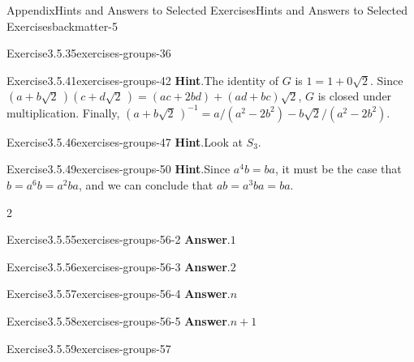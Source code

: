 \documentclass[oneside,10pt,]{book}
\newcommand{\blocktitlefont}{\relax}
\numberwithin{equation}{section}
\begin{document}
\begin{solutions-chapter}{Appendix}{Hints and Answers to Selected Exercises}{}{Hints and Answers to Selected Exercises}{}{}{backmatter-5}
\begin{divisionsolution}{Exercise}{3.5.35}{}{exercises-groups-36}
\end{divisionsolution}%
\begin{divisionsolution}{Exercise}{3.5.41}{}{exercises-groups-42}%
\noindent\textbf{\blocktitlefont Hint}.\hypertarget{exercises-groups-42-2-back}{}\quad{}The identity of \(G\) is \(1 = 1 + 0 \sqrt{2}\). Since \((a + b \sqrt{2}\, )(c + d \sqrt{2}\, ) = (ac + 2bd) + (ad + bc)\sqrt{2}\), \(G\) is closed under multiplication.  Finally,  \((a + b \sqrt{2}\, )^{-1} = a/(a^2 - 2b^2) - b\sqrt{2}/(a^2 - 2 b^2)\).%
\end{divisionsolution}%
\begin{divisionsolution}{Exercise}{3.5.46}{}{exercises-groups-47}%
\noindent\textbf{\blocktitlefont Hint}.\hypertarget{exercises-groups-47-2-back}{}\quad{}Look at \(S_3\).%
\end{divisionsolution}%
\begin{divisionsolution}{Exercise}{3.5.49}{}{exercises-groups-50}%
\noindent\textbf{\blocktitlefont Hint}.\hypertarget{exercises-groups-50-2-back}{}\quad{}Since \(a^4b = ba\), it must be the case that \(b = a^6 b = a^2 b a\), and we can conclude that \(ab = a^3 b a = ba\).%
\end{divisionsolution}%
\begin{exercisegroupcol}{2}
\begin{divisionsolutionegcol}{Exercise}{3.5.55}{}{exercises-groups-56-2}%
\noindent\textbf{\blocktitlefont Answer}.\hypertarget{exercises-groups-56-2-2-back}{}\quad{}\(1\)%
\end{divisionsolutionegcol}%
\begin{divisionsolutionegcol}{Exercise}{3.5.56}{}{exercises-groups-56-3}%
\noindent\textbf{\blocktitlefont Answer}.\hypertarget{exercises-groups-56-3-2-back}{}\quad{}\(2\)%
\end{divisionsolutionegcol}%
\begin{divisionsolutionegcol}{Exercise}{3.5.57}{}{exercises-groups-56-4}%
\noindent\textbf{\blocktitlefont Answer}.\hypertarget{exercises-groups-56-4-2-back}{}\quad{}\(n\)%
\end{divisionsolutionegcol}%
\begin{divisionsolutionegcol}{Exercise}{3.5.58}{}{exercises-groups-56-5}%
\noindent\textbf{\blocktitlefont Answer}.\hypertarget{exercises-groups-56-5-2-back}{}\quad{}\(n+1\)%
\end{divisionsolutionegcol}%
\end{exercisegroupcol}
\par\medskip\noindent
\begin{divisionsolution}{Exercise}{3.5.59}{}{exercises-groups-57}%

\end{divisionsolution}
\end{solutions-chapter}
\end{document}
